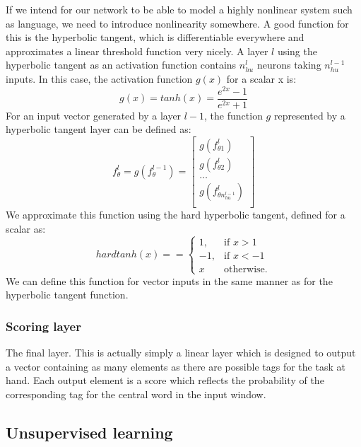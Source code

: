 If we intend for our network to be able to model a highly nonlinear
system such as language, we need to introduce nonlinearity
somewhere. A good function for this is the hyperbolic tangent, which
is differentiable everywhere and approximates a linear threshold
function very nicely. A layer $l$ using the hyperbolic tangent as an
activation function contains $n^l_{hu}$ neurons taking $n^{l-1}_{hu}$
inputs. In this case, the activation function $g(x)$ for a scalar x
is:
\begin{equation}
  g(x) = tanh(x) = \frac{e^{2x} - 1}{e^{2x} + 1}
\end{equation}
For an input vector generated by a layer $l - 1$, the function $g$ represented by a hyperbolic tangent layer can be defined as:
\begin{equation}
  f^l_{\theta} = g(f^{l-1}_{\theta})
  = \left[ \begin{array}{c}
      g(f^l_{\theta1}) \\
      g(f^l_{\theta2}) \\
      \ldots \\
      g(f^l_{\theta n^{l-1}_{hu}})\\ \end{array} \right]
\end{equation}
We approximate this function using the hard hyperbolic tangent, defined for a scalar as:
\begin{equation}
  hardtanh(x) = = \begin{cases} 1, & \mbox{if } x > 1 \\ -1, & \mbox{if } x < -1 \\ x & \mbox{otherwise.}\end{cases}
\end{equation}
We can define this function for vector inputs in the same manner
as for the hyperbolic tangent function.

\subsubsection{Scoring layer}

The final layer. This is actually simply a linear layer which is
designed to output a vector containing as many elements as there are
possible tags for the task at hand. Each output element is a score
which reflects the probability of the corresponding tag for the
central word in the input window.

\subsection{Unsupervised learning}
\label{sec:unsupervised}

